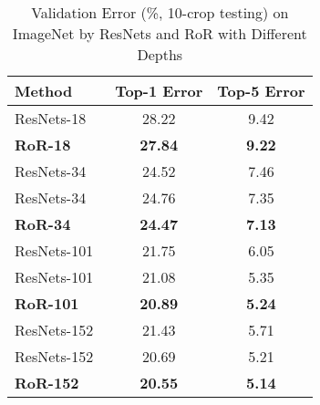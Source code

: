 \documentclass[journal]{IEEEtran}
\begin{document}
\begin{table}[!t]
\renewcommand{\arraystretch}{1.3}
\caption{Validation Error (\%, 10-crop testing) on ImageNet by ResNets and RoR with Different Depths}
\label{tab:imagenet}
\centering
\begin{tabular}{|l|c|c|}
\hline
Method                                       &Top-1 Error             &Top-5 Error  \\ \hline\hline
ResNets-18~\cite{gross2016facebookres}       &28.22                                  &9.42               \\\hline
\textbf{RoR-18}                            &\textbf{27.84}                                   &\textbf{9.22}                \\\hline
ResNets-34~\cite{ResNet}              &24.52                                  &7.46               \\\hline
ResNets-34~\cite{gross2016facebookres}       &24.76                                  &7.35               \\\hline
\textbf{RoR-34}                            &\textbf{24.47}                                   &\textbf{7.13}                \\\hline
ResNets-101~\cite{ResNet}             &21.75                                  &6.05               \\\hline
ResNets-101~\cite{gross2016facebookres}      &21.08                                  &5.35               \\\hline
\textbf{RoR-101}                           &\textbf{20.89}                                   &\textbf{5.24}               \\\hline
ResNets-152~\cite{ResNet}             &21.43                                  &5.71               \\\hline
ResNets-152~\cite{gross2016facebookres}      &20.69                                  &5.21               \\\hline
\textbf{RoR-152}                           &\textbf{20.55}                                   &\textbf{5.14}                \\\hline
\end{tabular}
\end{table}
\par
\end{document}
